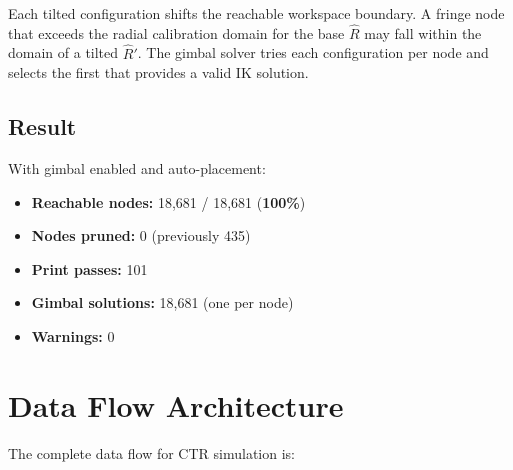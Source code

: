 \documentclass[11pt,a4paper]{article}
\begin{document}
Each tilted configuration shifts the reachable workspace boundary. A fringe node that exceeds the radial calibration domain for the base $\hat{R}$ may fall within the domain of a tilted $\hat{R}'$. The gimbal solver tries each configuration per node and selects the first that provides a valid IK solution.

\subsection{Result}

With gimbal enabled and auto-placement:
\begin{itemize}[nosep]
    \item \textbf{Reachable nodes:} 18,681 / 18,681 (\textbf{100\%})
    \item \textbf{Nodes pruned:} 0 (previously 435)
    \item \textbf{Print passes:} 101
    \item \textbf{Gimbal solutions:} 18,681 (one per node)
    \item \textbf{Warnings:} 0
\end{itemize}

\section{Data Flow Architecture}
\label{sec:dataflow}

The complete data flow for CTR simulation is:
\end{document}
